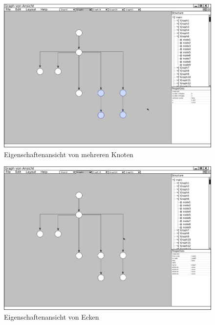 \begin{figure}[ht]
  \centering
  \includegraphics[width=380pt]{resourcen/gui_view_showInfoInProperties_multi.png}
  \caption{Eigenschaftenansicht von mehreren Knoten}
  \label{fig:gui_view_showInfoInProperties_multi}
\end{figure}

\begin{figure}[ht]
  \centering
  \includegraphics[width=380pt]{resourcen/gui_view_showInfoInProperties_edge.png}
  \caption{Eigenschaftenansicht von Ecken}
  \label{fig:gui_view_showInfoInProperties_edge}
\end{figure}

